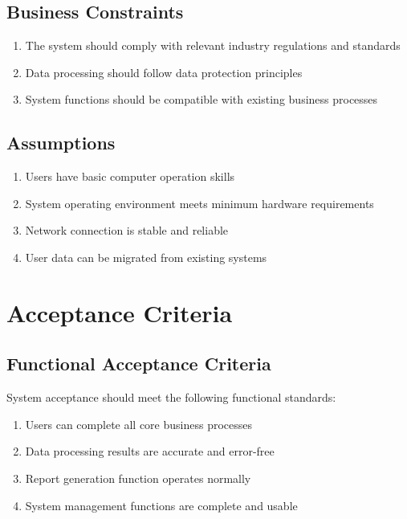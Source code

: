 \documentclass[a4paper,12pt]{article}
\begin{document}
\subsection{Business Constraints}

\begin{enumerate}
  \item The system should comply with relevant industry regulations and standards
  \item Data processing should follow data protection principles
  \item System functions should be compatible with existing business processes
\end{enumerate}

\subsection{Assumptions}

\begin{enumerate}
  \item Users have basic computer operation skills
  \item System operating environment meets minimum hardware requirements
  \item Network connection is stable and reliable
  \item User data can be migrated from existing systems
\end{enumerate}

\section{Acceptance Criteria}

\subsection{Functional Acceptance Criteria}

System acceptance should meet the following functional standards:

\begin{enumerate}
  \item Users can complete all core business processes
  \item Data processing results are accurate and error-free
  \item Report generation function operates normally
  \item System management functions are complete and usable
\end{enumerate}
\end{document}
